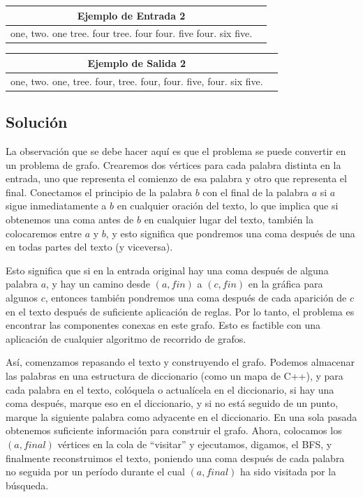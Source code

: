 \documentclass[12pt]{article}
\newcommand{\nl}{\vspace{0.3cm}}
\begin{document}
\begin{center}
	
	\nl
	
	\begin{tabular}{|c|c|}
		\hline Ejemplo de Entrada 2\\ 
		\hline one, two. one tree. four tree. four four. five four. six five.\\
		\hline 
	\end{tabular} 
	
	\nl
	
	\begin{tabular}{|c|c|}
		\hline Ejemplo de Salida 2\\ 
		\hline one, two. one, tree. four, tree. four, four. five, four. six five.\\ 
		\hline 
	\end{tabular} 
	
\end{center}

\subsection{Solución}

La observación que se debe hacer aquí es que el problema se puede convertir en un problema de grafo. Crearemos dos vértices para cada palabra distinta en la entrada, uno que representa el comienzo de esa palabra y otro que representa el final. Conectamos el principio de la palabra $b$ con el final de la palabra $a$ si $a$ sigue inmediatamente a $b$ en cualquier oración del texto, lo que implica que si obtenemos una coma antes de $b$ en cualquier lugar del texto, también la colocaremos entre $a$ y $b$, y esto significa que pondremos una coma después de una en todas partes del texto (y viceversa).

\nl

Esto significa que si en la entrada original hay una coma después de alguna palabra $a$, y hay un camino desde $(a, fin)$ a $(c, fin)$ en la gráfica para algunos $c$, entonces también pondremos una coma después de cada aparición de $c$ en el texto después de suficiente aplicación de reglas. Por lo tanto, el problema es encontrar las componentes conexas en este grafo. Esto es factible con una aplicación de cualquier algoritmo de recorrido de grafos.

\nl

Así, comenzamos repasando el texto y construyendo el grafo. Podemos almacenar las palabras en una estructura de diccionario (como un mapa de C++), y para cada palabra en el texto, colóquela o actualícela en el diccionario, si hay una coma después, marque eso en el diccionario, y si no está seguido de un punto, marque la siguiente palabra como adyacente en el diccionario. En una sola pasada obtenemos suficiente información para construir el grafo. Ahora, colocamos los $(a, final)$ vértices en la cola de “visitar” y ejecutamos, digamos, el BFS, y finalmente reconstruimos el texto, poniendo una coma después de cada palabra no seguida por un período durante el cual $(a, final)$ ha sido visitada por la búsqueda.
\end{document}
